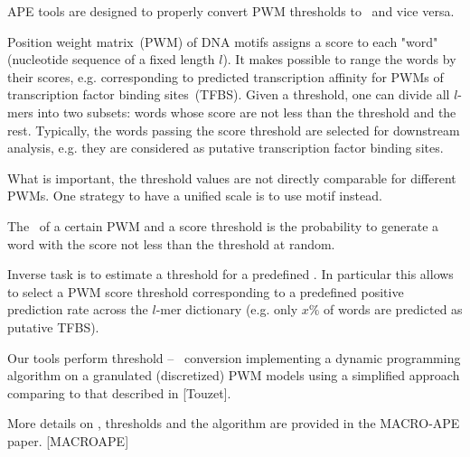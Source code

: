 APE tools are designed to properly convert PWM thresholds to \pvalues\ and vice versa.

Position weight matrix~(PWM) of DNA motifs assigns a score to each "word" (nucleotide sequence of a fixed length $l$). It makes 
possible to range the words by their scores, e.g. corresponding to predicted transcription affinity for PWMs of transcription factor binding sites~(TFBS). Given a threshold, one can divide all $l$-mers into two subsets: words whose score are not less than the threshold and the rest. Typically, the words passing the score threshold are selected for downstream analysis, e.g. they are considered as putative transcription factor binding sites. 

What is important, the threshold values are not directly comparable for different PWMs. One strategy to have a unified scale is to use motif \pvalues instead.

The \pvalue\ of a certain PWM and a score threshold is the probability to generate a word with the score not less than the threshold at random.

Inverse task is to estimate a threshold for a predefined \pvalue. In particular this allows to select a PWM score threshold corresponding to a predefined positive prediction rate across the $l$-mer dictionary (e.g. only $x\%$ of words are predicted as putative TFBS).

Our tools perform threshold -- \pvalue\ conversion implementing a dynamic programming algorithm on a granulated (discretized) PWM models using a simplified approach comparing to that described in [Touzet].

More details on \pvalues, thresholds and the algorithm are provided in the MACRO-APE paper. [MACROAPE] 
